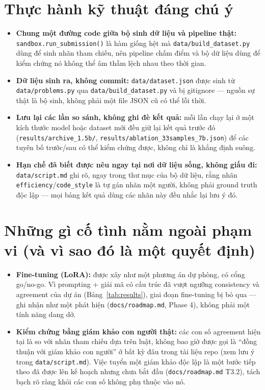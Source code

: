 \documentclass[11pt,a4paper]{article}
\begin{document}
\section{Thực hành kỹ thuật đáng chú ý}

\begin{itemize}[leftmargin=1.4em]
  \item \textbf{Chung một đường code giữa bộ sinh dữ liệu và pipeline
    thật:} \texttt{sandbox.run\_submission()} là hàm giống hệt mà
    \texttt{data/build\_dataset.py} dùng để sinh nhãn tham chiếu, nên
    pipeline chấm điểm và bộ dữ liệu dùng để kiểm chứng nó không thể âm
    thầm lệch nhau theo thời gian.
  \item \textbf{Dữ liệu sinh ra, không commit:}
    \texttt{data/dataset.json} được sinh từ \texttt{data/problems.py} qua
    \texttt{data/build\_dataset.py} và bị gitignore — nguồn sự thật là bộ
    sinh, không phải một file JSON cũ có thể lỗi thời.
  \item \textbf{Lưu lại các lần so sánh, không ghi đè kết quả:} mỗi lần
    chạy lại ở một kích thước model hoặc dataset mới đều giữ lại kết quả
    trước đó (\texttt{results/archive\_1.5b/},
    \texttt{results/ablation\_33samples\_7b.json}) để các tuyên bố
    trước/sau có thể kiểm chứng được, không chỉ là khẳng định suông.
  \item \textbf{Hạn chế đã biết được nêu ngay tại nơi dữ liệu sống, không
    giấu đi:} \texttt{data/script.md} ghi rõ, ngay trong thư mục của bộ dữ
    liệu, rằng nhãn \texttt{efficiency}/\texttt{code\_style} là tự gán
    nhãn một người, không phải ground truth độc lập — mọi bảng kết quả
    dùng các nhãn này đều nhắc lại lưu ý đó.
\end{itemize}

\section{Những gì cố tình nằm ngoài phạm vi (và vì sao đó là một quyết định)}

\begin{itemize}[leftmargin=1.4em]
  \item \textbf{Fine-tuning (LoRA):} được xây như một phương án dự phòng,
    có cổng go/no-go. Vì prompting + giải mã có cấu trúc đã vượt ngưỡng
    consistency và agreement của dự án (Bảng~\ref{tab:results}), giai đoạn
    fine-tuning bị bỏ qua — ghi nhận như một phát hiện
    (\texttt{docs/roadmap.md}, Phase 4), không phải một tính năng dang dở.
  \item \textbf{Kiểm chứng bằng giám khảo con người thật:} các con số
    agreement hiện tại là so với nhãn tham chiếu dựa trên luật, không bao
    giờ được gọi là ``đồng thuận với giám khảo con người'' ở bất kỳ đâu
    trong tài liệu repo (xem lưu ý trong \texttt{data/script.md}). Việc
    tuyển một giám khảo độc lập là một bước tiếp theo đã được lên kế
    hoạch nhưng chưa bắt đầu (\texttt{docs/roadmap.md} T3.2), tách bạch
    rõ ràng khỏi các con số không phụ thuộc vào nó.
\end{itemize}
\end{document}
